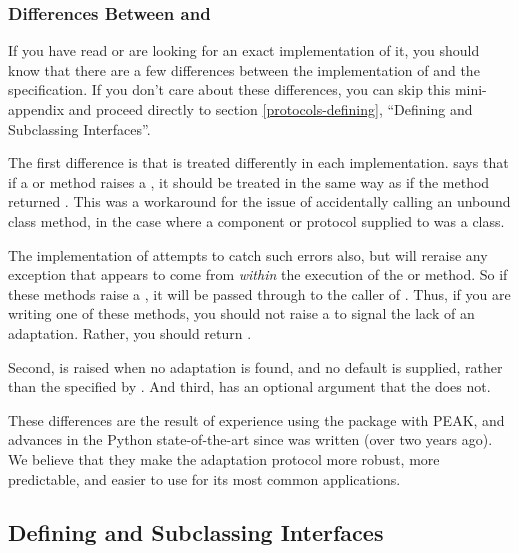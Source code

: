 \begin{verbatim%
}
\begin{verbatim%
}
\subsubsection{Differences Between  and }

If you have read  or are looking for an exact implementation of it,
you should know that there are a few differences between the 
implementation of  and the  specification.  If you
don't care about these differences, you can skip this mini-appendix and
proceed directly to section \ref{protocols-defining}, ``Defining and Subclassing
Interfaces''.

The first difference is that  is treated differently in
each implementation.   says that if a  or
 method raises a , it should be
treated in the same way as if the method returned .  This was
a workaround for the issue of accidentally calling an unbound class
method, in the case where a component or protocol supplied to
 was a class.

The  implementation of  attempts to catch
such errors also, but will reraise any exception that appears to come from
\emph{within} the execution of the  or
 method.  So if these methods raise a ,
it will be passed through to the caller of .  Thus, if you
are writing one of these methods, you should not raise a 
to signal the lack of an adaptation.  Rather, you should return .

Second,  is raised when no adaptation is
found, and no default is supplied, rather than the 
specified by .  And third,  has an optional
 argument that the   does not.

These differences are the result of experience using the 
package with PEAK, and advances in the Python state-of-the-art since
 was written (over two years ago).  We believe that they make the
adaptation protocol more robust, more predictable, and easier to use for
its most common applications.






\subsection{Defining and Subclassing Interfaces \label{protocols-defining}}


\end{verbatim%
}
\end{verbatim%
}

